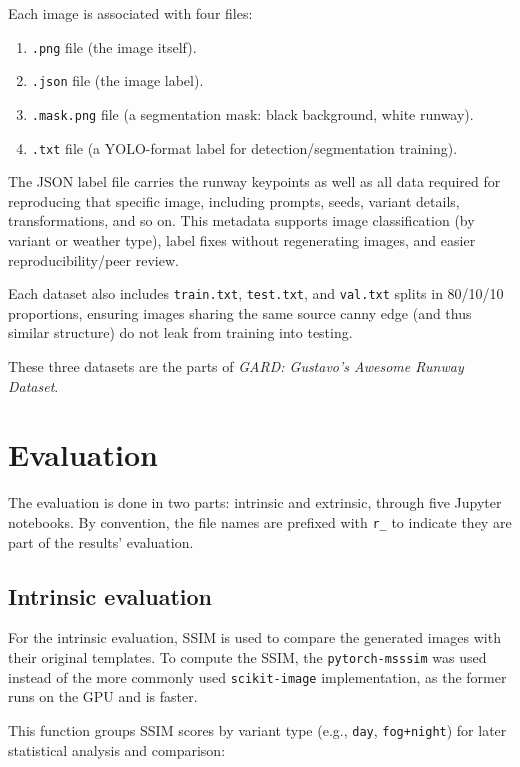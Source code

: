 Each image is associated with four files:
\begin{enumerate}
\item \texttt{.png} file (the image itself).
\item \texttt{.json} file (the image label).
\item \texttt{.mask.png} file (a segmentation mask: black background, white runway).
\item \texttt{.txt} file (a YOLO-format label for detection/segmentation training).
\end{enumerate}

The JSON label file carries the runway keypoints as well as all data required for reproducing that specific image, including prompts, seeds, variant details, transformations, and so on. 
This metadata supports image classification (by variant or weather type), label fixes without regenerating images, and easier reproducibility/peer review.

Each dataset also includes \texttt{train.txt}, \texttt{test.txt}, and \texttt{val.txt} splits in 80/10/10 proportions, ensuring images sharing the same source canny edge (and thus similar structure) do not leak from training into testing.

These three datasets are the parts of \emph{GARD: Gustavo's Awesome Runway Dataset}.

\section{Evaluation}

The evaluation is done in two parts: intrinsic and extrinsic, through five
Jupyter notebooks. By convention, the file names are prefixed with \texttt{r\_} to
indicate they are part of the results' evaluation.

\subsection{Intrinsic evaluation}

For the intrinsic evaluation, \ac{SSIM} is used to compare the generated images
with their original templates. To compute the SSIM, the \texttt{pytorch-msssim}
\cite{pessoa_jorge-pessoapytorch-msssim_2025}
was used instead of the more commonly used \texttt{scikit-image}
\cite{van_der_walt_scikit-image_2014}
implementation,
as the former runs on the GPU and is faster.

This function groups SSIM scores by variant type (e.g., \texttt{day},
\texttt{fog+night}) for later statistical analysis and comparison:


